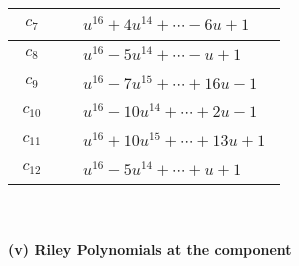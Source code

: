 \documentclass[1p]{elsarticle_modified}
\theoremstyle{definition}
\begin{document}
\begin{tabular}{m{50pt}|m{274pt}}
\hline $$\begin{aligned}c_{7}\end{aligned}$$&$\begin{aligned}
&u^{16}+4 u^{14}+\cdots-6 u+1
\end{aligned}$\\
\hline $$\begin{aligned}c_{8}\end{aligned}$$&$\begin{aligned}
&u^{16}-5 u^{14}+\cdots- u+1
\end{aligned}$\\
\hline $$\begin{aligned}c_{9}\end{aligned}$$&$\begin{aligned}
&u^{16}-7 u^{15}+\cdots+16 u-1
\end{aligned}$\\
\hline $$\begin{aligned}c_{10}\end{aligned}$$&$\begin{aligned}
&u^{16}-10 u^{14}+\cdots+2 u-1
\end{aligned}$\\
\hline $$\begin{aligned}c_{11}\end{aligned}$$&$\begin{aligned}
&u^{16}+10 u^{15}+\cdots+13 u+1
\end{aligned}$\\
\hline $$\begin{aligned}c_{12}\end{aligned}$$&$\begin{aligned}
&u^{16}-5 u^{14}+\cdots+u+1
\end{aligned}$\\
\hline
\end{tabular}\\~\\
\newpage\renewcommand{\arraystretch}{1}
\flushleft \textbf{(v) Riley Polynomials at the component}\newline \\
\end{document}
